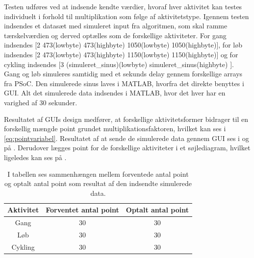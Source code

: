 Testen udføres ved at indsende kendte værdier, hvoraf hver aktivitet kan testes individuelt i forhold til multiplikation som følge af aktivitetstype. Igennem testen indsendes et datasæt med simuleret input fra algoritmen, som skal ramme tærskelværdien og derved optælles som de forskellige aktiviteter. For gang indsendes [2 473(lowbyte) 473(highbyte) 1050(lowbyte) 1050(highbyte)], for løb indsendes [2 473(lowbyte) 473(highbyte) 1150(lowbyte) 1150(highbyte)] og for cykling indsendes [3 (simuleret\_sinus)(lowbyte) simuleret\_sinus(highbyte) ]. Gang og løb simuleres samtidig med et sekunds delay gennem forskellige arrays fra PSoC. Den simulerede sinus laves i MATLAB, hvorfra det direkte benyttes i GUI. Alt det simulerede data indsendes i MATLAB, hvor det hver har en varighed af 30 sekunder.

Resultatet af GUIs design medfører, at forskellige aktivitetsformer bidrager til en forskellig mængde point grundet multiplikationsfaktoren, hvilket kan ses i \eqref{eq:pointvariabel}. Resultatet af at sende de simulerede data gennem GUI ses i  og på . Derudover lægges point for de forskellige aktiviteter i et søjlediagram, hvilket ligeledes kan ses på .
\begin{table}[H]
	\centering
	\begin{tabular}{ccc}
		\hline
		\rowcolor[HTML]{C0C0C0} 
		Aktivitet 	& Forventet antal point & Optalt antal point \\ \hline
		Gang 	&  30 & 30  \\ \hline
		Løb 	& 30 & 30 \\ \hline
		Cykling & 30 & 30 \\ \hline
	\end{tabular}
	\caption{I tabellen ses sammenhængen mellem forventede antal point og optalt antal point som resultat af den indsendte simulerede data.}
	\label{test:GUI}
\end{table}\vspace{-.2cm}

